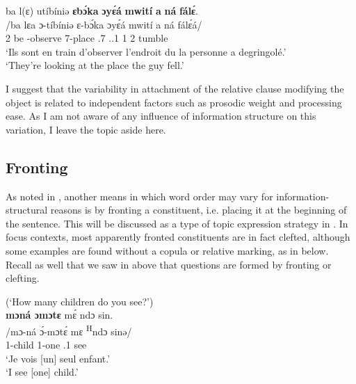\documentclass[output=paper,colorlinks,citecolor=brown
]{langscibook}
\begin{document}
 \z

\ea
\label{relativeguyfell}
\glll
{\db}ba l(ɛ) utíbíniə \textbf{ɛbɔ́ka} \textbf{ɔyɛ́á} \textbf{mwití} \textbf{a} \textbf{ná} \textbf{fálɛ́}. \\
/ba lɛa ɔ-tíbíniə ɛ-bɔ́ka ɔyɛ́á mwití a ná fálɛ́á/ \\
{\db}2\SM{} be \INF{}-observe 7-place \REL{}.7{} \PRO.\OBJ.1 1\SM{} \PST{}2{} tumble \\
\glt
`Ils sont en train d'observer l'endroit du la personne a degringolé.' \\ `They're looking at the place the guy fell.'\jambox*{[PM 582] }

\z
 
I suggest that the variability in attachment of the relative clause modifying the object is related to independent factors such as prosodic weight and processing ease. As I am not aware of any influence of information structure on this variation, I leave the topic aside here.


\subsection{Fronting}
As noted in \citet{Mous1997}, another means in which word order may vary for information-structural reasons is by fronting a constituent, i.e. placing it at the beginning of the sentence. This will be discussed as a type of topic expression strategy in . In focus contexts, most apparently fronted constituents are in fact clefted, although some examples are found without a copula or relative marking, as in  below. Recall as well that we saw in  above that questions are formed by fronting or clefting.

\ea
\label{howmanyfronted}
(`How many children do you see?') \\ 
\glll
{\db}\textbf{mɔná ɔmɔtɛ} mɛ́ ndɔ sin. \\
/mɔ-ná ɔ́-mɔtɛ́ mɛ \textsuperscript{H}ndɔ sinə/ \\
{\db}1-child 1-one \SM{}.1\SG{} \PRS{} see \\
\glt
`Je vois [un]\textsubscript{\FOC{}} seul enfant.' \\ `I see [one]\textsubscript{\FOC{}} child.' \jambox*{[DM 147] }

\z
\end{document}
